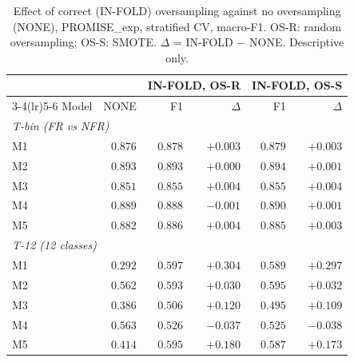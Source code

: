 \begin{table}[H]
\centering
\caption{Effect of correct (IN-FOLD) oversampling against no oversampling (NONE), PROMISE\_exp, stratified CV, macro-F1. OS-R: random oversampling; OS-S: SMOTE. $\Delta$ = IN-FOLD $-$ NONE. Descriptive only.}
\label{tab:none_infold}
\small
\setlength{\tabcolsep}{4pt}
\begin{tabular}{lrrrrr}
\toprule
& & \multicolumn{2}{c}{IN-FOLD, OS-R} & \multicolumn{2}{c}{IN-FOLD, OS-S} \\
\cmidrule(lr){3-4}\cmidrule(lr){5-6}
Model & NONE & F1 & $\Delta$ & F1 & $\Delta$ \\
\midrule
\multicolumn{6}{l}{\textit{T-bin (FR vs NFR)}} \\
M1 & $0.876$ & $0.878$ & $+0.003$ & $0.879$ & $+0.003$ \\
M2 & $0.893$ & $0.893$ & $+0.000$ & $0.894$ & $+0.001$ \\
M3 & $0.851$ & $0.855$ & $+0.004$ & $0.855$ & $+0.004$ \\
M4 & $0.889$ & $0.888$ & $-0.001$ & $0.890$ & $+0.001$ \\
M5 & $0.882$ & $0.886$ & $+0.004$ & $0.885$ & $+0.003$ \\
\midrule
\multicolumn{6}{l}{\textit{T-12 (12 classes)}} \\
M1 & $0.292$ & $0.597$ & $+0.304$ & $0.589$ & $+0.297$ \\
M2 & $0.562$ & $0.593$ & $+0.030$ & $0.595$ & $+0.032$ \\
M3 & $0.386$ & $0.506$ & $+0.120$ & $0.495$ & $+0.109$ \\
M4 & $0.563$ & $0.526$ & $-0.037$ & $0.525$ & $-0.038$ \\
M5 & $0.414$ & $0.595$ & $+0.180$ & $0.587$ & $+0.173$ \\
\bottomrule
\end{tabular}
\end{table}
